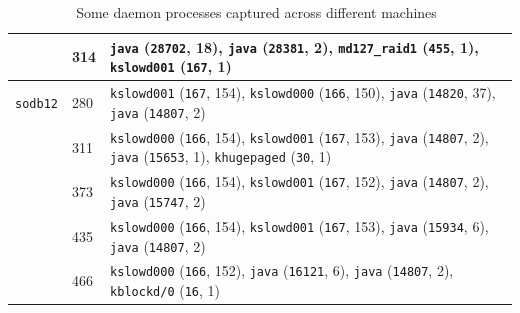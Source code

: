 \begin{table}[htp!]
{\begin{tabular}{|p{1.5cm}|p{2cm}|p{12.5cm}|}
					 & 314 & {\tt java} ({\tt 28702}, 18), {\tt java} ({\tt 28381}, 2),  {\tt md127\_raid1} ({\tt 455}, 1),  {\tt kslowd001} ({\tt 167}, 1) \\ \hline
 {\tt sodb12}  & 280 &  {\tt kslowd001} ({\tt 167}, 154),  {\tt kslowd000} ({\tt 166}, 150), {\tt java} ({\tt 14820}, 37), {\tt java} ({\tt 14807}, 2) \\ \cline{2-3}
	& 311 &  {\tt kslowd000} ({\tt 166}, 154),  {\tt kslowd001} ({\tt 167}, 153), {\tt java} ({\tt 14807}, 2), {\tt java} ({\tt 15653}, 1), {\tt khugepaged} ({\tt 30}, 1)\\ \cline{2-3}		& 373 &  {\tt kslowd000} ({\tt 166}, 154),  {\tt kslowd001} ({\tt 167}, 152), {\tt java} ({\tt 14807}, 2), {\tt java} ({\tt 15747}, 2)\\ \cline{2-3}
& 435 &  {\tt kslowd000} ({\tt 166}, 154),  {\tt kslowd001} ({\tt 167}, 153), {\tt java} ({\tt 15934}, 6), {\tt java} ({\tt 14807}, 2)\\ \cline{2-3}
& 466 &  {\tt kslowd000} ({\tt 166}, 152), {\tt java} ({\tt 16121}, 6), {\tt java} ({\tt 14807}, 2), {\tt kblockd/0} ({\tt 16}, 1)\\ \cline{2-3}
 \hline
 \end{tabular}
  }
 \caption{Some daemon processes captured across different machines~\label{fig:daemon}}
\end{table}